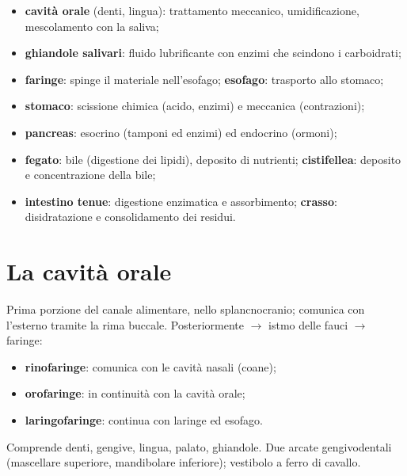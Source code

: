 \begin{itemize}
  \item \textbf{cavità orale} (denti, lingua): trattamento meccanico, umidificazione, mescolamento
    con la saliva;
  \item \textbf{ghiandole salivari}: fluido lubrificante con enzimi che scindono i carboidrati;
  \item \textbf{faringe}: spinge il materiale nell'esofago; \textbf{esofago}: trasporto allo stomaco;
  \item \textbf{stomaco}: scissione chimica (acido, enzimi) e meccanica (contrazioni);
  \item \textbf{pancreas}: esocrino (tamponi ed enzimi) ed endocrino (ormoni);
  \item \textbf{fegato}: bile (digestione dei lipidi), deposito di nutrienti; \textbf{cistifellea}:
    deposito e concentrazione della bile;
  \item \textbf{intestino tenue}: digestione enzimatica e assorbimento; \textbf{crasso}:
    disidratazione e consolidamento dei residui.
\end{itemize}

\section{La cavità orale}

Prima porzione del canale alimentare, nello splancnocranio; comunica con l'esterno tramite la rima
buccale. Posteriormente $\rightarrow$ istmo delle fauci $\rightarrow$ faringe:
\begin{itemize}
  \item \textbf{rinofaringe}: comunica con le cavità nasali (coane);
  \item \textbf{orofaringe}: in continuità con la cavità orale;
  \item \textbf{laringofaringe}: continua con laringe ed esofago.
\end{itemize}
Comprende denti, gengive, lingua, palato, ghiandole. Due arcate gengivodentali (mascellare superiore,
mandibolare inferiore); vestibolo a ferro di cavallo.

